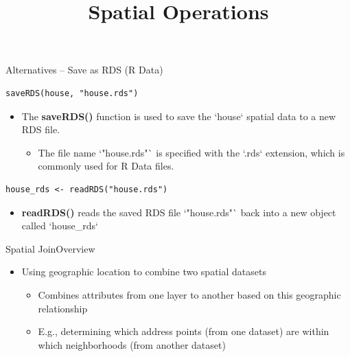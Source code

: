\documentclass[hyperref={pdfpagelabels=false}]{beamer}
\begin{document}
\begin{frame}[fragile]{Alternatives -- Save as RDS (R Data)
}
\begin{lstlisting}
saveRDS(house, "house.rds")
\end{lstlisting}
\begin{itemize}
	\item The \textbf{saveRDS()} function is used to save the `house` spatial data to a new RDS file.
	\vspace{0.2cm}
	\begin{itemize}
		\item The file name `"house.rds"` is specified with the `.rds` extension, which is commonly used for R Data files.
	\end{itemize}
\end{itemize}

\begin{lstlisting}
house_rds <- readRDS("house.rds")
\end{lstlisting}
\begin{itemize}
	\item \textbf{readRDS()} reads the saved RDS file `"house.rds"` back into a new object called `house\_rds`
\end{itemize}
\end{frame}





\title[]  
{Spatial Operations}


\author 
{}

\institute{}






\date
{}


\begin{frame}{}
	\titlepage
\end{frame}



\begin{frame}{Spatial Join}{Overview}
	\begin{itemize}
		\item Using geographic location to combine two spatial datasets 
				\vspace{0.2cm}
		\begin{itemize}
	\item Combines attributes from one layer to another based on this geographic relationship
					\vspace{0.2cm}
	\item E.g., determining which address points (from one dataset) are within which neighborhoods (from another dataset)			
				\end{itemize}	
				
				
	\end{itemize}
\end{frame}
\end{document}
